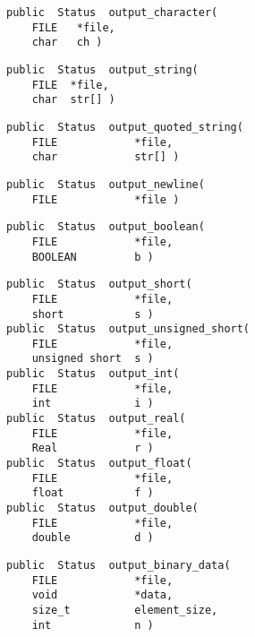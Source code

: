 {\bf\begin{verbatim}
public  Status  output_character(
    FILE   *file,
    char   ch )
\end{verbatim}}


{\bf\begin{verbatim}
public  Status  output_string(
    FILE  *file,
    char  str[] )
\end{verbatim}}


{\bf\begin{verbatim}
public  Status  output_quoted_string(
    FILE            *file,
    char            str[] )
\end{verbatim}}


{\bf\begin{verbatim}
public  Status  output_newline(
    FILE            *file )
\end{verbatim}}


{\bf\begin{verbatim}
public  Status  output_boolean(
    FILE            *file,
    BOOLEAN         b )
\end{verbatim}}


{\bf\begin{verbatim}
public  Status  output_short(
    FILE            *file,
    short           s )
public  Status  output_unsigned_short(
    FILE            *file,
    unsigned short  s )
public  Status  output_int(
    FILE            *file,
    int             i )
public  Status  output_real(
    FILE            *file,
    Real            r )
public  Status  output_float(
    FILE            *file,
    float           f )
public  Status  output_double(
    FILE            *file,
    double          d )
\end{verbatim}}


{\bf\begin{verbatim}
public  Status  output_binary_data(
    FILE            *file,
    void            *data,
    size_t          element_size,
    int             n )
\end{verbatim}}

